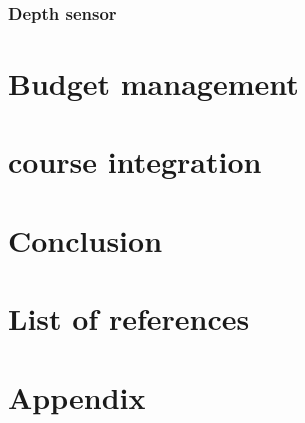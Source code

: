 \documentclass{article}
\begin{document}
\subsubsection{Depth sensor}

\section{Budget management}

\section{course integration}

\section{Conclusion}

\section{List of references}

\section{Appendix}
\end{document}
